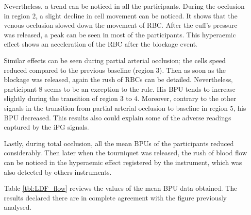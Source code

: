 Nevertheless, a trend can be noticed in all the participants. During the occlusion in region 2, a slight decline in cell movement can be noticed. It shows that the venous occlusion slowed down the movement of RBC. After the cuff's pressure was released, a peak can be seen in most of the participants. This hyperaemic effect shows an acceleration of the RBC after the blockage event. 

Similar effects can be seen during partial arterial occlusion; the cells speed reduced compared to the previous baseline (region 3). Then as soon as the blockage was released, again the rush of RBCs can be detailed. Nevertheless, participant 8 seems to be an exception to the rule. His BPU tends to increase slightly during the transition of region 3 to 4. Moreover, contrary to the other signals in the transition from partial arterial occlusion to baseline in region 5, his BPU decreased. This results also could explain some of the adverse readings captured by the iPG signals.

Lastly, during total occlusion, all the mean BPUs of the participants reduced considerably. Then later when the tourniquet was released, the rush of blood flow can be noticed in the hyperaemic effect registered by the instrument, which was also detected by others instruments.

Table \ref{tbl:LDF_flow} reviews the values of the mean BPU data obtained. The results declared there are in complete agreement with the figure previously analysed.

